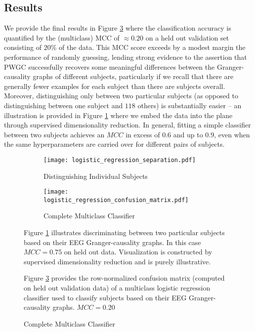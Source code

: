 \documentclass[12pt]{article}
\begin{document}
\subsection{Results}
We provide the final results in Figure
\ref{fig:logistic_regression_results} where the classification
accuracy is quantified by the (multiclass) MCC of $\approx 0.20$ on a held
out validation set consisting of $20\%$ of the data.  This MCC score
exceeds by a modest margin the performance of randomly guessing,
lending strong evidence to the assertion that PWGC successfully
recovers some meaningful differences between the Granger-causality
graphs of different subjects, particularly if we recall that there are
generally fewer examples for each subject than there are subjects
overall.  Moreover, distinguishing only between two particular
subjects (as opposed to distinguishing between one subject and $118$
others) is substantially easier -- an illustration is provided in
Figure \ref{fig:logistic_regression_2pair} where we embed the data
into the plane through supervised dimensionality reduction.  In
general, fitting a simple classifier between two subjects achieves an
$MCC$ in excess of $0.6$ and up to $0.9$, even when the same
hyperparameters are carried over for different pairs of subjects.

\begin{figure}
  \centering
  \caption{Subject Classification from Granger-causality Graphs}
  \begin{subfigure}[b]{0.45\textwidth}
    \caption{Distinguishing Individual Subjects}
    \label{fig:logistic_regression_2pair}
    \texttt{[image: logistic\_regression\_separation.pdf]}
  \end{subfigure}
  \begin{subfigure}[b]{0.45\textwidth}
    \caption{Complete Multiclass Classifier}
    \label{fig:logistic_regression_results}
    \texttt{[image: logistic\_regression\_confusion\_matrix.pdf]}

    {\scriptsize }
  \end{subfigure}

  {\scriptsize Figure \ref{fig:logistic_regression_2pair} illustrates
    discriminating between two particular subjects based on their
    EEG Granger-causality graphs.  In this case $MCC = 0.75$ on held
    out data.  Visualization is constructed by supervised
    dimensionality reduction and is purely illustrative.

    Figure \ref{fig:logistic_regression_results} provides the
    row-normalized confusion matrix (computed on held out validation
    data) of a multiclass logistic regression classifier used to
    classify subjects based on their EEG Granger-causality graphs.  $MCC = 0.20$}
\end{figure}
\end{document}
